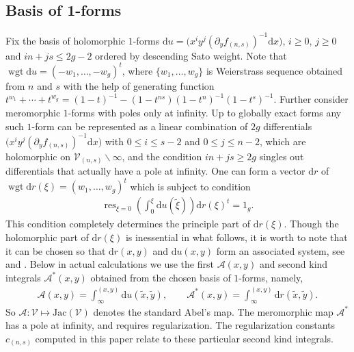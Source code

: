 \documentclass[pdftex]{sigma}
\numberwithin{equation}{section}
\DeclareMathOperator{\res}{res}
\DeclareMathOperator{\wgt}{wgt}
\newcommand{\rmd}{\mathrm{d}}
\newcommand{\Jac}{\mathrm{Jac}}
\begin{document}
\subsection{Basis of 1-forms}\label{ss:CoHomolBasis}
Fix the basis of holomorphic $1$-forms $\rmd u = \big(x^i y^j (\partial_y f_{(n,s)})^{-1}\rmd x\big)$, $i\geqslant 0$, $j\geqslant 0$ and $i n+j s\leqslant 2g-2$ ordered by descending Sato weight. Note that $\wgt \rmd u = ({-}w_1,\dots,{-}w_g)^t$, where $\{w_1,\dots,w_g\}$ is Weierstrass sequence obtained from $n$ and $s$ with the help of generating function $t^{w_1}+\cdots +t^{w_g}= (1-t)^{-1}- (1-t^{ns}) (1-t^n)^{-1}(1-t^s)^{-1}$. Further consider meromorphic $1$-forms with poles only at infinity. Up to globally exact forms any such $1$-form can be represented as a linear combination of $2g$ differentials $\big(x^i y^j (\partial_y f_{(n,s)})^{-1} \rmd x\big)$ with $0\leqslant i \leqslant s-2$ and $0\leqslant j \leqslant n-2$, which are holomorphic on $\mathcal{V}_{(n,s)}\backslash \infty$, and the condition $i n+j s\geqslant 2g$ singles out differentials that actually have a pole at infinity. One can form a vector $\rmd r$ of $\wgt \rmd r(\xi) = (w_1,\dots,w_g)^t$ which is subject to condition
\begin{gather}\label{DiffAjst}
\res_{\xi=0} \left(\int_0^{\xi} \rmd u(\tilde{\xi})\right) \rmd r(\xi)^t = 1_g.
\end{gather}
This condition completely determines the {principle part of $\rmd r(\xi)$.} Though the holomorphic part of $\rmd r(\xi)$ is inessential in what follows, it is {worth} to note that it can be chosen so that $\rmd r(x,y)$ and $\rmd u(x,y)$ form an associated system, see \cite[Section~138]{BakerAF} and \cite[p.~131]{EEL2000}. Below in actual calculations we use the {first $\mathcal{A}(x,y)$ and second kind integrals $\mathcal{A}^\ast(x,y)$ obtained from the chosen basis of $1$-forms}, namely,
\begin{gather*}\mathcal{A}(x,y) = \int_{\infty}^{(x,y)} \rmd u(\tilde{x},\tilde{y}),\qquad \mathcal{A}^\ast(x,y) = \int_{\infty}^{(x,y)} \rmd r(\tilde{x},\tilde{y}).\end{gather*}
So $\mathcal{A}\colon \mathcal{V} \mapsto \Jac(\mathcal{V})$ denotes the standard Abel's map. The meromorphic map $\mathcal{A}^\ast$ has a pole at infinity, and requires regularization. The regularization constants~$c_{(n,s)}$ computed in this paper relate to these particular second kind integrals.
\end{document}

